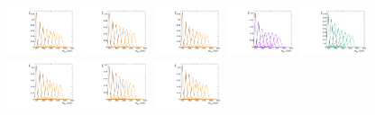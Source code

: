 \begin{figure}[htbp]
  \centering
  \includegraphics[width=0.18\textwidth]{fig/analysisAppendix/templateSignalVsMX_fromDC_GbuToWW_MVV_mu_HP_bb_HDy.pdf}
  \includegraphics[width=0.18\textwidth]{fig/analysisAppendix/templateSignalVsMX_fromDC_RadToWW_MVV_mu_HP_bb_HDy.pdf}
  \includegraphics[width=0.18\textwidth]{fig/analysisAppendix/templateSignalVsMX_fromDC_ZprToWW_MVV_mu_HP_bb_HDy.pdf}
  \includegraphics[width=0.18\textwidth]{fig/analysisAppendix/templateSignalVsMX_fromDC_WprToWZ_MVV_mu_HP_bb_HDy.pdf}
  \includegraphics[width=0.18\textwidth]{fig/analysisAppendix/templateSignalVsMX_fromDC_WprToWH_MVV_mu_HP_bb_HDy.pdf}\\
  \includegraphics[width=0.18\textwidth]{fig/analysisAppendix/templateSignalVsMX_fromDC_GbuToWW_MVV_mu_LP_bb_HDy.pdf}
  \includegraphics[width=0.18\textwidth]{fig/analysisAppendix/templateSignalVsMX_fromDC_RadToWW_MVV_mu_LP_bb_HDy.pdf}
  \includegraphics[width=0.18\textwidth]{fig/analysisAppendix/templateSignalVsMX_fromDC_ZprToWW_MVV_mu_LP_bb_HDy.pdf}

\end{figure}
